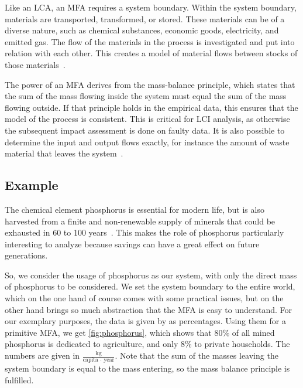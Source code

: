    
    Like an LCA, an MFA requires a system boundary.
    Within the system boundary, materials are transported, transformed, or stored.
    These materials can be of a diverse nature, such as chemical substances, economic goods, electricity, and emitted gas.
    The flow of the materials in the process is investigated and put into relation with each other.
    This creates a model of material flows between stocks of those materials~\autocite{brunner2017}.
    
    
    
    The power of an MFA derives from the mass-balance principle, which states that the sum of the mass flowing inside the system must equal the sum of the mass flowing outside.
    If that principle holds in the empirical data, this ensures that the model of the process is consistent.
    This is critical for LCI analysis, as otherwise the subsequent impact assessment is done on faulty data.
    It is also possible to determine the input and output flows exactly, for instance the amount of waste material that leaves the system~\autocite{brunner2017}.
    
    
    
    \subsection{Example}
    
    
    The chemical element phosphorus is essential for modern life, but is also harvested from a finite and non-renewable supply of minerals that could be exhausted in 60 to 100 years~\autocite{steen1998}.
    This makes the role of phosphorus particularly interesting to analyze because savings can have a great effect on future generations.
    
    
    So, we consider the usage of phosphorus as our system, with only the direct mass of phosphorus to be considered.
    We set the system boundary to the entire world, which on the one hand of course comes with some practical issues, but on the other hand brings so much abstraction that the MFA is easy to understand.
    For our exemplary purposes, the data is given by \autocite{steen1998} as percentages.
    Using them for a primitive MFA, we get \autoref{fig:phosphorus}, which shows that 80\% of all mined phosphorus is dedicated to agriculture, and only 8\% to private households.
    The numbers are given in $\frac{\text{kg}}{\text{capita } \cdot \text{ year}}$.
    Note that the sum of the masses leaving the system boundary is equal to the mass entering, so the mass balance principle is fulfilled.


